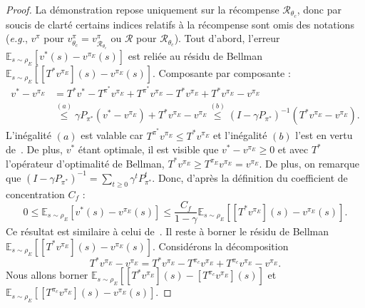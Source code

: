 \documentclass[english,utf8]{./hermes-journal}
\newcommand{\R}{\mathcal{R}}
\newcommand{\E}{\mathbb{E}}
\begin{document}
\begin{proof}
  La démonstration repose uniquement sur la récompense $\R_{\theta_c}$, donc par soucis de clarté certains indices relatifs à la récompense sont omis des notations  
  (\textit{e.g.}, $v^\pi$ pour
  $v^\pi_{\theta_c}=v^\pi_{\R_{\theta_c}}$ ou $\R$ pour $\R_{\theta_c}$). Tout d'abord, l'erreur $\E_{s\sim\rho_E}[v^*(s)-v^{\pi_E}(s)]$ est reliée au résidu de Bellman $\E_{s\sim\rho_E}[[T^*v^{\pi_E}](s)-v^{\pi_E}(s)]$.
  Composante par composante :
  \begin{align}
    v^* - v^{\pi_E} &= T^* v^*  - T^{\pi^*}v^{\pi_E} +
    T^{\pi^*}v^{\pi_E} - T^* v^{\pi_E} + T^* v^{\pi_E} - v^{\pi_E}
    \\
    &\stackrel{(a)}{\leq} \gamma P_{\pi^*}(v^*-v^{\pi_E}) + T^*
    v^{\pi_E} - v^{\pi_E}
    \stackrel{(b)}{\leq} (I-\gamma
    P_{\pi^*})^{-1} (T^* v^{\pi_E} - v^{\pi_E}).
  \end{align}
  L'inégalité $(a)$ est valable car $T^{\pi^*} v^{\pi_E}\leq T^*
  v^{\pi_E}$ et l'inégalité $(b)$ l'est en vertu de~\cite[Lemme~4.2]{Munos:2007}. De plus, $v^*$ étant optimale, il est visible que  $v^*-v^{\pi_E}\geq 0$ et avec $T^*$ l'opérateur d'optimalité de Bellman, $T^* v^{\pi_E}\geq
  T^{\pi_E}v^{\pi_E}=v^{\pi_E}$. De plus, on remarque que 
  $(I-\gamma P_{\pi^*})^{-1} = \sum_{t\geq 0}\gamma^t P_{\pi^*}^t$.
  Donc, d'après la définition du coefficient de concentration 
  $C_f$ :
  \begin{equation}
    0\leq\E_{s\sim\rho_E}[v^*(s)-v^{\pi_E}(s)] \leq \frac{C_f}{1-\gamma}
    \E_{s\sim\rho_E}\left[[T^*v^{\pi_E}](s) - v^{\pi_E}(s)\right].
    \label{eq:proof:residual}
  \end{equation}
  Ce résultat est similaire à celui de~\cite[Theoreme~4.2]{Munos:2007}. Il reste à borner le résidu de Bellman $\E_{s\sim\rho_E}[[T^*v^{\pi_E}](s) -
  v^{\pi_E}(s)]$. Considérons la décomposition
  \begin{equation}
    T^* v^{\pi_E} - v^{\pi_E} = T^* v^{\pi_E} - T^{\pi_c}v^{\pi_E}
    + T^{\pi_c}v^{\pi_E}- v^{\pi_E}.
    \label{eq:proof:decomposition}
  \end{equation}
  Nous allons borner  $\E_{s\sim\rho_E}[[T^* v^{\pi_E}](s) - [T^{\pi_c}v^{\pi_E}](s)]$
  et $\E_{s\sim\rho_E}[[T^{\pi_c}v^{\pi_E}](s) - v^{\pi_E}(s)]$.


\end{proof}
\end{document}
